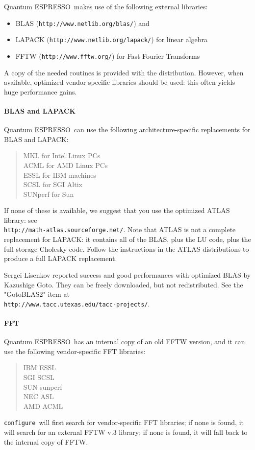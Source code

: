\documentclass[12pt,a4paper]{article}
\def\qe{{\sc Quantum ESPRESSO}}
\def\configure{\texttt{configure}}
\begin{document}
\qe\ makes use of the following external libraries:
\begin{itemize}
\item BLAS (\texttt{http://www.netlib.org/blas/}) and 
\item LAPACK (\texttt{http://www.netlib.org/lapack/}) for linear algebra 
\item FFTW (\texttt{http://www.fftw.org/}) for Fast Fourier Transforms
\end{itemize}
A copy of the needed routines is provided with the distribution. However,
when available, optimized vendor-specific libraries should be used: this
often yields huge performance gains.

\paragraph{BLAS and LAPACK} 
\qe\ can use the following architecture-specific replacements for BLAS and LAPACK:\\
\begin{quote}
MKL for Intel Linux PCs\\
ACML for AMD Linux PCs\\
ESSL for IBM machines\\
SCSL for SGI Altix\\
SUNperf for Sun
\end{quote}
If none of these is available, we suggest that you use the optimized ATLAS library: see \\
\texttt{http://math-atlas.sourceforge.net/}. Note that ATLAS is not
a complete replacement for LAPACK: it contains all of the BLAS, plus the
LU code, plus the full storage Cholesky code. Follow the instructions in the
ATLAS distributions to produce a full LAPACK replacement.
    
Sergei Lisenkov reported success and good performances with optimized
BLAS by Kazushige Goto. They can be freely downloaded,
but not redistributed. See the "GotoBLAS2" item at\\
\texttt{http://www.tacc.utexas.edu/tacc-projects/}.

\paragraph{FFT}
\qe\ has an internal copy of an old FFTW version, and it 
can use the following vendor-specific FFT libraries:
\begin{quote}
      IBM ESSL\\
      SGI SCSL\\
      SUN sunperf\\
      NEC ASL\\
      AMD ACML
\end{quote}
\configure\ will first search for vendor-specific FFT libraries;
if none is found, it will search for an external FFTW v.3 library;
if none is found, it will fall back to the internal  copy of FFTW.
\end{document}
